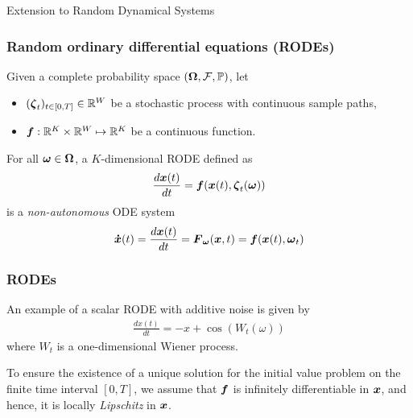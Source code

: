 \begin{frame}
    \begin{center}
        {\large Extension to Random Dynamical Systems}
    \end{center}        
\end{frame}

\begin{frame}[t]
    \frametitle{Random ordinary differential equations (RODEs)}
    Given a complete probability space $(\boldsymbol{\Omega}, \mathcal{F}, \mathbb{P})$, let 
    \begin{itemize}
        \item[] $(\boldsymbol{\zeta}_t)_{t\in [0,T]} \in \mathbb{R}^W$ be a stochastic process with continuous sample paths,
        \item[] $\boldsymbol{f}: \mathbb{R}^K\times\mathbb{R}^W\mapsto\mathbb{R}^K$ be a continuous function.
    \end{itemize}
    
    \vspace{\baselineskip}
    For all $\boldsymbol{\omega} \in \boldsymbol{\Omega}$, a $K$-dimensional RODE defined as
    \begin{align}
        \frac{d\boldsymbol{x}(t)}{dt} = \boldsymbol{f}(\boldsymbol{x}(t), \boldsymbol{\zeta}_t(\boldsymbol{\omega}))
        \label{eq-rodes}
    \end{align}
    is a \emph{non-autonomous} ODE system
    \begin{align}
        \boldsymbol{\dot{x}}(t) = \frac{d\boldsymbol{x}(t)}{dt} = \boldsymbol{F}_{\boldsymbol{\omega}}(\boldsymbol{x}, t) = \boldsymbol{f}(\boldsymbol{x}(t), \boldsymbol{\omega}_t)
        \label{eq-rodes-odes}
    \end{align}    
\end{frame}

\begin{frame}[t]
    \frametitle{RODEs}
    An example of a scalar RODE with additive noise is given by
    \begin{align}
        \frac{dx(t)}{dt} = -x + \cos{(W_t(\omega))}
        \label{eq-rodes-example}
    \end{align}
    where $W_t$ is a one-dimensional Wiener process.
    
    \vspace{1\baselineskip}    
    To ensure the existence of a unique solution for the initial value problem on the finite time interval $[0,T]$, we assume that $\boldsymbol{f}$ is infinitely differentiable in $\boldsymbol{x}$, and hence, it is locally \emph{Lipschitz} in $\boldsymbol{x}$. 
\end{frame}

